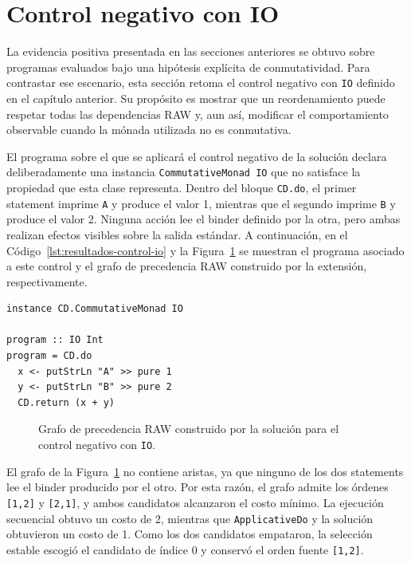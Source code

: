 
\section{Control negativo con IO}
\label{sec:resultados-io}

La evidencia positiva presentada en las secciones anteriores se obtuvo sobre programas evaluados bajo una hipótesis explícita de conmutatividad. Para contrastar ese escenario, esta sección retoma el control negativo con \texttt{IO} definido en el capítulo anterior. Su propósito es mostrar que un reordenamiento puede respetar todas las dependencias RAW y, aun así, modificar el comportamiento observable cuando la mónada utilizada no es conmutativa.

El programa sobre el que se aplicará el control negativo de la solución declara deliberadamente una instancia \texttt{CommutativeMonad IO} que no satisface la propiedad que esta clase representa. Dentro del bloque \texttt{CD.do}, el primer statement imprime \texttt{A} y produce el valor 1, mientras que el segundo imprime \texttt{B} y produce el valor 2. Ninguna acción lee el binder definido por la otra, pero ambas realizan efectos visibles sobre la salida estándar. A continuación, en el Código~\ref{lst:resultados-control-io} y la Figura~\ref{fig:resultados-grafo-control-io} se muestran el programa asociado a este control y el grafo de precedencia RAW construido por la extensión, respectivamente.

\begin{lstlisting}[style=haskell,caption={Programa asociado al control negativo con \texttt{IO}.},label={lst:resultados-control-io}]
instance CD.CommutativeMonad IO

program :: IO Int
program = CD.do
  x <- putStrLn "A" >> pure 1
  y <- putStrLn "B" >> pure 2
  CD.return (x + y)
\end{lstlisting}

\begin{figure}[ht]
\centering
\begin{PrecedenceGraph}
\end{PrecedenceGraph}
\caption[Grafo RAW del control con \texttt{IO}.]{Grafo de precedencia RAW construido por la solución para el control negativo con \texttt{IO}.}
\label{fig:resultados-grafo-control-io}
\end{figure}

El grafo de la Figura~\ref{fig:resultados-grafo-control-io} no contiene aristas, ya que ninguno de los dos statements lee el binder producido por el otro. Por esta razón, el grafo admite los órdenes \texttt{[1,2]} y \texttt{[2,1]}, y ambos candidatos alcanzaron el costo mínimo. La ejecución secuencial obtuvo un costo de 2, mientras que \texttt{ApplicativeDo} y la solución obtuvieron un costo de 1. Como los dos candidatos empataron, la selección estable escogió el candidato de índice 0 y conservó el orden fuente \texttt{[1,2]}.

